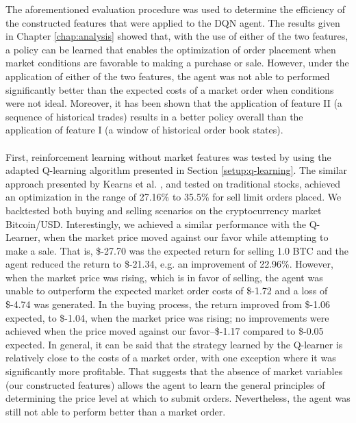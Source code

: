     The aforementioned evaluation procedure was used to determine the efficiency of the constructed features that were applied to the DQN agent.
    The results given in Chapter \ref{chap:analysis} showed that, with the use of either of the two features, a policy can be learned that enables the  optimization of order placement when market conditions are favorable to making a purchase or sale.
    However, under the application of either of the two features, the agent was not able to performed significantly better than the expected costs of a market order when conditions were not ideal.
    Moreover, it has been shown that the application of feature II (a sequence of historical trades) results in a better policy overall than the application of feature I (a window of historical order book states).
    \\
    \\
    First, reinforcement learning without market features was tested by using the adapted Q-learning algorithm presented in Section \ref{setup:q-learning}.
    The similar approach presented by Kearns et al. \cite{nevmyvaka2006reinforcement}, and tested on traditional stocks, achieved an optimization in the range of 27.16\% to 35.5\% for sell limit orders placed.
    We backtested both buying and selling scenarios on the cryptocurrency market Bitcoin/USD.
    Interestingly, we achieved a similar performance with the Q-Learner, when the market price moved against our favor while attempting to make a sale.
    That is, \$-27.70 was the expected return for selling 1.0 BTC and the agent reduced the return to \$-21.34, e.g. an improvement of 22.96\%.
    However, when the market price was rising, which is in favor of selling, the agent was unable to outperform the expected market order costs of \$-1.72 and a loss of \$-4.74 was generated.
    In the buying process, the return improved from \$-1.06 expected, to \$-1.04, when the market price was rising; no improvements were achieved when the price moved against our favor--\$-1.17 compared to \$-0.05 expected.
    In general, it can be said that the strategy learned by the Q-learner is relatively close to the costs of a market order, with one exception where it was significantly more profitable.
    That suggests that the absence of market variables (our constructed features) allows the agent to learn the general principles of determining the price level at which to submit orders. 
    Nevertheless, the agent was still not able to perform better than a market order.
    

